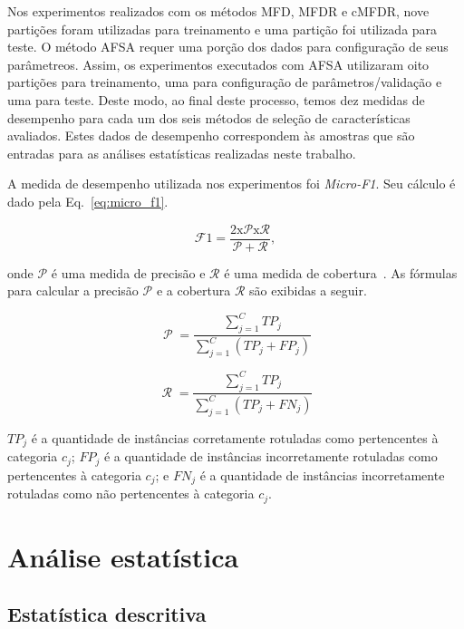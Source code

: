 \documentclass[conference]{IEEEtran}
\begin{document}
Nos experimentos realizados com os métodos MFD, MFDR e cMFDR, nove partições foram utilizadas para treinamento e uma partição foi utilizada para teste.
O método AFSA requer uma porção dos dados para configuração de seus parâmetreos. Assim, os experimentos executados com AFSA utilizaram oito partições para treinamento, uma para configuração de parâmetros/validação e uma para teste.
Deste modo, ao final deste processo, temos dez medidas de desempenho para cada um dos seis métodos de seleção de características avaliados.
Estes dados de desempenho correspondem às amostras que são entradas para as análises estatísticas realizadas neste trabalho.

A medida de desempenho utilizada nos experimentos foi \textit{Micro-F1}.
Seu cálculo é dado pela Eq.~\ref{eq:micro_f1}.

\begin{equation}
\operatorname{\mathcal{F}{1} = \frac{2 x \mathcal{P} x \mathcal{R}}{\mathcal{P} + \mathcal{R}}},
\label{eq:micro_f1}
\end{equation}

\noindent onde $\mathcal{P}$ é uma medida de precisão e $\mathcal{R}$ é uma medida de cobertura~\cite{chang2008multilabel}. As fórmulas para calcular a precisão $\mathcal{P}$ e a cobertura $\mathcal{R}$ são exibidas a seguir.

\begin{equation}
\operatorname{\mathcal{P}} = \frac{\sum_{j=1}^{C}TP_j}{\sum_{j=1}^{C}(TP_j + FP_j)}
\label{eq:precision}
\end{equation}

\begin{equation}
\operatorname{\mathcal{R}} = \frac{\sum_{j=1}^{C}TP_j}{\sum_{j=1}^{C}(TP_j + FN_j)}
\label{eq:recall}
\end{equation}

$TP_j$ é a quantidade de instâncias corretamente rotuladas como pertencentes à categoria $c_j$; $FP_j$ é a quantidade de instâncias incorretamente rotuladas como pertencentes à categoria $c_j$; e $FN_j$ é a quantidade de instâncias incorretamente rotuladas como não pertencentes à categoria $c_j$. 

\section{Análise estatística}
\label{sec:analise}

\subsection{Estatística descritiva}
\label{sec:estat_descr}
\end{document}
